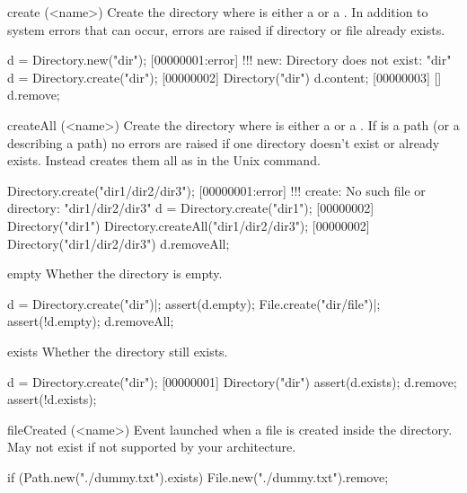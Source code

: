 \begin{urbiscriptapi}
\item[create](<name>)
  Create the directory  where  is either a
   or a . In addition to system errors that
  can occur, errors are raised if directory or file  already exists.
\begin{urbiscript}
d = Directory.new("dir");
[00000001:error] !!! new: Directory does not exist: "dir"
d = Directory.create("dir");
[00000002] Directory("dir")
d.content;
[00000003] []
d.remove;
\end{urbiscript}

\item[createAll](<name>)
  Create the directory  where  is either a
   or a . If  is a
  path (or a  describing a path) no errors are
  raised if one directory doesn't exist or already exists. Instead
   creates them all as in the Unix  command.
\begin{urbiscript}
Directory.create("dir1/dir2/dir3");
[00000001:error] !!! create: No such file or directory: "dir1/dir2/dir3"
d = Directory.create("dir1");
[00000002] Directory("dir1")
Directory.createAll("dir1/dir2/dir3");
[00000002] Directory("dir1/dir2/dir3")
d.removeAll;
\end{urbiscript}

\item[empty]
  Whether the directory is empty.
\begin{urbiscript}
d = Directory.create("dir")|;
assert(d.empty);
File.create("dir/file")|;
assert(!d.empty);
d.removeAll;
\end{urbiscript}

\item[exists]
  Whether the directory still exists.
\begin{urbiscript}
d = Directory.create("dir");
[00000001] Directory("dir")
assert(d.exists);
d.remove;
assert(!d.exists);
\end{urbiscript}

\item[fileCreated](<name>)%
  Event launched when a file is created inside the directory.
  May not exist if not supported by your architecture.

\begin{urbiscript}[firstnumber=1]
if (Path.new("./dummy.txt").exists)
  File.new("./dummy.txt").remove;


\end{urbiscript}
\end{urbiscriptapi}
